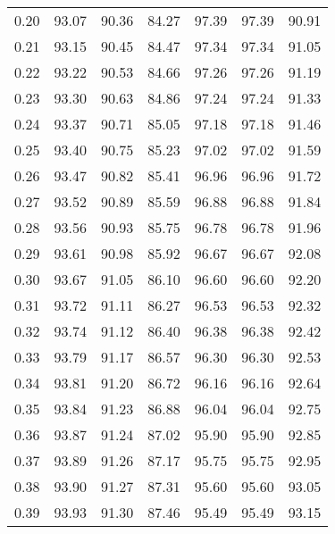 \begin{tabular}{|c|c|c|c|c|c|c|}
      0.20 &     93.07 &     90.36 &      84.27 &   97.39 &      97.39 &         90.91 \\
      0.21 &     93.15 &     90.45 &      84.47 &   97.34 &      97.34 &         91.05 \\
      0.22 &     93.22 &     90.53 &      84.66 &   97.26 &      97.26 &         91.19 \\
      0.23 &     93.30 &     90.63 &      84.86 &   97.24 &      97.24 &         91.33 \\
      0.24 &     93.37 &     90.71 &      85.05 &   97.18 &      97.18 &         91.46 \\
      0.25 &     93.40 &     90.75 &      85.23 &   97.02 &      97.02 &         91.59 \\
      0.26 &     93.47 &     90.82 &      85.41 &   96.96 &      96.96 &         91.72 \\
      0.27 &     93.52 &     90.89 &      85.59 &   96.88 &      96.88 &         91.84 \\
      0.28 &     93.56 &     90.93 &      85.75 &   96.78 &      96.78 &         91.96 \\
      0.29 &     93.61 &     90.98 &      85.92 &   96.67 &      96.67 &         92.08 \\
      0.30 &     93.67 &     91.05 &      86.10 &   96.60 &      96.60 &         92.20 \\
      0.31 &     93.72 &     91.11 &      86.27 &   96.53 &      96.53 &         92.32 \\
      0.32 &     93.74 &     91.12 &      86.40 &   96.38 &      96.38 &         92.42 \\
      0.33 &     93.79 &     91.17 &      86.57 &   96.30 &      96.30 &         92.53 \\
      0.34 &     93.81 &     91.20 &      86.72 &   96.16 &      96.16 &         92.64 \\
      0.35 &     93.84 &     91.23 &      86.88 &   96.04 &      96.04 &         92.75 \\
      0.36 &     93.87 &     91.24 &      87.02 &   95.90 &      95.90 &         92.85 \\
      0.37 &     93.89 &     91.26 &      87.17 &   95.75 &      95.75 &         92.95 \\
      0.38 &     93.90 &     91.27 &      87.31 &   95.60 &      95.60 &         93.05 \\
      0.39 &     93.93 &     91.30 &      87.46 &   95.49 &      95.49 &         93.15 \\

\end{tabular}
